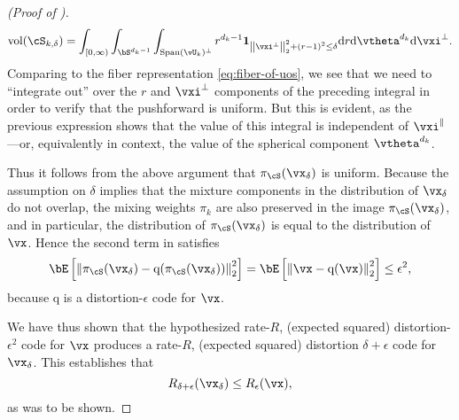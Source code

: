 \documentclass[../../book-main.tex]{subfiles}
\begin{document}
\begin{proof}[(Proof of )]
\begin{equation}
        \volume(\cS_{k, \delta})
        = \int_{[0, \infty)} \int_{\bS^{d_k-1}} \int_{\Span(\vU_k)^\perp} 
        r^{d_k-1}
        \mathbf{1}_{
            \norm*{\vxi^{\perp}}_2^2
            + \left( r - 1 \right)^2
            \leq
            \delta
        }
        \odif r \odif \vtheta^{d_k} \odif \vxi^{\perp}.
    \end{equation}
    Comparing to the fiber representation \eqref{eq:fiber-of-uos},
    we see that we need to ``integrate out'' over the $r$ and $\vxi^\perp$
    components of the preceding integral in order to verify that the pushforward
    is uniform.
    But this is evident, as the previous expression shows that the value of this
    integral is independent of $\vxi^\|$---or, equivalently in context, the
    value of the spherical component $\vtheta^{d_k}$.

    Thus it follows from the above argument that $\pi_{\cS}(\vx_{\delta})$ is
    uniform.
    Because the assumption on $\delta$ implies that the mixture components in
    the distribution of $\vx_{\delta}$ do not overlap, the mixing weights
    $\pi_k$ are also preserved in the image $\pi_{\cS}(\vx_{\delta})$, and in
    particular, the distribution of $\pi_{\cS}(\vx_{\delta})$ is equal to the
    distribution of $\vx$.
    Hence the second term in  satisfies
    \begin{equation}
        \bE\left[ \norm*{ \pi_{\cS}(\vx_{\delta}) - \mathrm{q}(\pi_{\cS}(\vx_{\delta})) }_2^2 \right]
        =
        \bE\left[ \norm*{ \vx - \mathrm{q}(\vx) }_2^2 \right]
        \leq
        \epsilon^2,
    \end{equation}
    because $\mathrm{q}$ is a distortion-$\epsilon$ code for $\vx$.

    We have thus shown that the hypothesized rate-$R$, (expected squared)
    distortion-$\epsilon^2$ code for $\vx$ produces a rate-$R$, (expected
    squared) distortion $\delta + \epsilon$ code for $\vx_{\delta}$.
    This establishes that
    \begin{equation}
        R_{\delta + \epsilon}(\vx_{\delta})
        \leq
        R_{\epsilon}(\vx),
    \end{equation}
    as was to be shown.



\end{proof}
\end{document}
